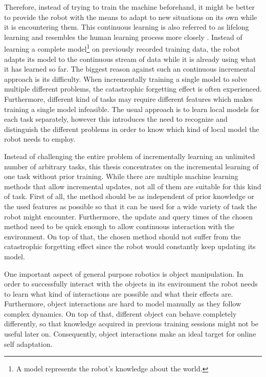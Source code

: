 Therefore, instead of trying to train the machine beforehand, it might be better to provide the robot with the means to adapt to new situations on its own while it is encountering them. 
This continuous learning is also referred to as lifelong learning and resembles the human learning process more closely \cite{silver2013lifelong}.
Instead of learning a complete model\footnote{A model represents the robot's knowledge about the world.} on previously recorded training data, the robot adapts its model to the continuous stream of data while it is already using what it has learned so far. 
The biggest reason against such an continuous incremental approach is its difficulty. When incrementally training a single model to solve multiple different problems, the catastrophic forgetting effect is often experienced. Furthermore, different kind of tasks may require different features which makes training a single model infeasible. The usual approach is to learn local models for each task separately, however this introduces the need to recognize and distinguish the different problems in order to know which kind of local model the robot needs to employ.

Instead of challenging the entire problem of incrementally learning an unlimited number of arbitrary tasks, this thesis concentrates on the incremental learning of one task without prior training. 
While there are multiple machine learning methods that allow incremental updates, not all of them are suitable for this kind of task. 
First of all, the method should be as independent of prior knowledge or the used features as possible so that it can be used for a wide variety of task the robot might encounter. Furthermore, the update and query times of the chosen method need to be quick enough to allow continuous interaction with the environment. On top of that, the chosen method should not suffer from the catastrophic forgetting effect since the robot would constantly keep updating its model. 

One important aspect of general purpose robotics is object manipulation. In order to successfully interact with the objects in its environment the robot needs to learn what kind of interactions are possible and what their effects are. 
Furthermore, object interactions are hard to model manually as they follow complex dynamics. On top of that, different object can behave completely differently, so that knowledge acquired in previous training sessions might not be useful later on. Consequently, object interactions make an ideal target for online self adaptation. 

